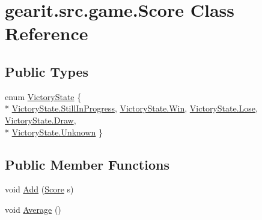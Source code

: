 \hypertarget{classgearit_1_1src_1_1game_1_1_score}{\section{gearit.\+src.\+game.\+Score Class Reference}
\label{classgearit_1_1src_1_1game_1_1_score}
}
\subsection*{Public Types}
\begin{DoxyCompactItemize}
\item 
enum \hyperlink{classgearit_1_1src_1_1game_1_1_score_a48f48fc89bbc2f4e7009a8a31e0dd700}{Victory\+State} \{ \\*
\hyperlink{classgearit_1_1src_1_1game_1_1_score_a48f48fc89bbc2f4e7009a8a31e0dd700a52e2ba5a0ef3a914edf94cc44805136d}{Victory\+State.\+Still\+In\+Progress}, 
\hyperlink{classgearit_1_1src_1_1game_1_1_score_a48f48fc89bbc2f4e7009a8a31e0dd700a119eac47719cc9be7b99124712e229da}{Victory\+State.\+Win}, 
\hyperlink{classgearit_1_1src_1_1game_1_1_score_a48f48fc89bbc2f4e7009a8a31e0dd700a02cf70d59ed69d7c9dd21d30e490e050}{Victory\+State.\+Lose}, 
\hyperlink{classgearit_1_1src_1_1game_1_1_score_a48f48fc89bbc2f4e7009a8a31e0dd700a2d03c2d5a7ec65ef4619e0582c272ec2}{Victory\+State.\+Draw}, 
\\*
\hyperlink{classgearit_1_1src_1_1game_1_1_score_a48f48fc89bbc2f4e7009a8a31e0dd700a88183b946cc5f0e8c96b2e66e1c74a7e}{Victory\+State.\+Unknown}
 \}
\end{DoxyCompactItemize}
\subsection*{Public Member Functions}
\begin{DoxyCompactItemize}
\item 
void \hyperlink{classgearit_1_1src_1_1game_1_1_score_adc3c918a4122b905c1d965eaadfa2e85}{Add} (\hyperlink{classgearit_1_1src_1_1game_1_1_score}{Score} s)
\item 
void \hyperlink{classgearit_1_1src_1_1game_1_1_score_a922e0b52d4790192993c8bdff6022cd3}{Average} ()
\end{DoxyCompactItemize}
